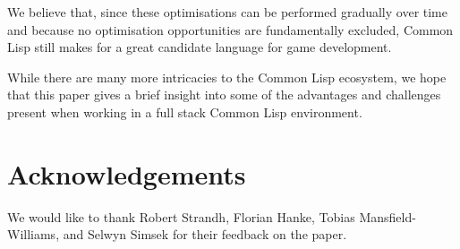 \documentclass[a4paper]{paper}
\begin{document}
We believe that, since these optimisations can be performed gradually over time and because no optimisation opportunities are fundamentally excluded, Common Lisp still makes for a great candidate language for game development.

While there are many more intricacies to the Common Lisp ecosystem, we hope that this paper gives a brief insight into some of the advantages and challenges present when working in a full stack Common Lisp environment.

\section{Acknowledgements}
We would like to thank Robert Strandh, Florian Hanke, Tobias Mansfield-Williams, and Selwyn Simsek for their feedback on the paper.


\end{document}
